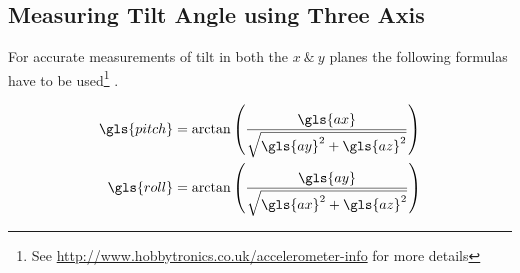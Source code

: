 \tocless\subsection{Measuring Tilt Angle using Three Axis}
For accurate measurements of tilt in both the $x ~\mathrm{\&}~ y $ planes the following formulas have to be used\footnote{See \url{http://www.hobbytronics.co.uk/accelerometer-info} for more details}
.

\begin{align}
	\begin{split}
		\gls{pitch} &= \arctan\left(\frac{\gls{ax}}{\sqrt{\gls{ay}^2 + \gls{az}^2}}\right)\\
		\gls{roll} &= \arctan\left(\frac{\gls{ay}}{\sqrt{\gls{ax}^2 + \gls{az}^2}}\right)
	\end{split}
\end{align}
